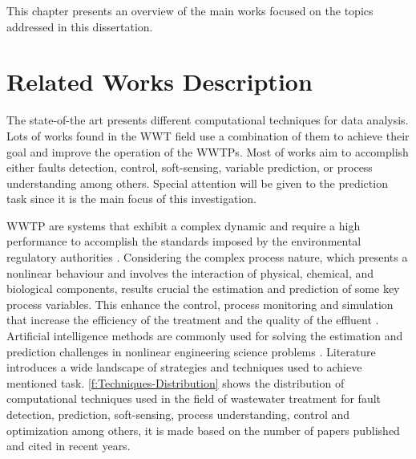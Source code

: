 This chapter presents an overview of the main works focused on the topics addressed in this dissertation.

\section{Related Works Description}
\label{s:RelatedWorks-Description}

The state-of-the art presents different computational techniques for data analysis. Lots of works found in the \ac{WWT} field use a combination of them to achieve their goal and improve the operation of the \acs{WWTP}s. Most of works aim to accomplish either faults detection, control, soft-sensing, variable prediction, or process understanding among others. Special attention will be given to the prediction task since it is the main focus of this investigation.

\ac{WWTP} are systems that exhibit a complex dynamic and require a high performance to accomplish the standards imposed by the environmental regulatory authorities \cite{Corominas2018}.  Considering the complex process nature, which presents a nonlinear behaviour and involves the interaction of physical, chemical, and biological components, results crucial the estimation and prediction of some key process variables. This enhance the control, process monitoring and simulation that increase the efficiency of the treatment  and the quality of the effluent \cite{Aalami2019,Arismendy2020,Liu2020}. Artificial intelligence methods are commonly used for solving the estimation and prediction challenges in nonlinear engineering science  problems \cite{Lotfi2019}. Literature introduces a wide landscape of strategies and techniques used to achieve mentioned task. \autoref{f:Techniques-Distribution} \cite{Corominas2018} shows the distribution of computational techniques used in the field of wastewater treatment for fault detection, prediction, soft-sensing, process understanding, control and optimization among others, it is made based on the number of papers published and cited in recent years. 

